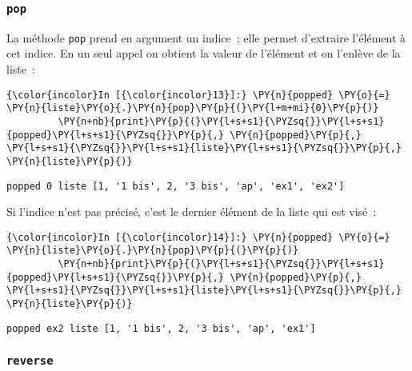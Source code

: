     \hypertarget{pop}{%
\subsubsection{\texorpdfstring{\texttt{pop}}{pop}}\label{pop}}

    La méthode \texttt{pop} prend en argument un indice~; elle permet
d'extraire l'élément à cet indice. En un seul appel on obtient la valeur
de l'élément et on l'enlève de la liste~:

    \begin{Verbatim}[commandchars=\\\{\},frame=single,framerule=0.3mm,rulecolor=\color{cellframecolor}]
{\color{incolor}In [{\color{incolor}13}]:} \PY{n}{popped} \PY{o}{=} \PY{n}{liste}\PY{o}{.}\PY{n}{pop}\PY{p}{(}\PY{l+m+mi}{0}\PY{p}{)}
         \PY{n+nb}{print}\PY{p}{(}\PY{l+s+s1}{\PYZsq{}}\PY{l+s+s1}{popped}\PY{l+s+s1}{\PYZsq{}}\PY{p}{,} \PY{n}{popped}\PY{p}{,} \PY{l+s+s1}{\PYZsq{}}\PY{l+s+s1}{liste}\PY{l+s+s1}{\PYZsq{}}\PY{p}{,} \PY{n}{liste}\PY{p}{)}
\end{Verbatim}


    \begin{Verbatim}[commandchars=\\\{\},frame=single,framerule=0.3mm,rulecolor=\color{cellframecolor}]
popped 0 liste [1, '1 bis', 2, '3 bis', 'ap', 'ex1', 'ex2']
\end{Verbatim}

    Si l'indice n'est pas précisé, c'est le dernier élément de la liste qui
est visé~:

    \begin{Verbatim}[commandchars=\\\{\},frame=single,framerule=0.3mm,rulecolor=\color{cellframecolor}]
{\color{incolor}In [{\color{incolor}14}]:} \PY{n}{popped} \PY{o}{=} \PY{n}{liste}\PY{o}{.}\PY{n}{pop}\PY{p}{(}\PY{p}{)}
         \PY{n+nb}{print}\PY{p}{(}\PY{l+s+s1}{\PYZsq{}}\PY{l+s+s1}{popped}\PY{l+s+s1}{\PYZsq{}}\PY{p}{,} \PY{n}{popped}\PY{p}{,} \PY{l+s+s1}{\PYZsq{}}\PY{l+s+s1}{liste}\PY{l+s+s1}{\PYZsq{}}\PY{p}{,} \PY{n}{liste}\PY{p}{)}
\end{Verbatim}


    \begin{Verbatim}[commandchars=\\\{\},frame=single,framerule=0.3mm,rulecolor=\color{cellframecolor}]
popped ex2 liste [1, '1 bis', 2, '3 bis', 'ap', 'ex1']
\end{Verbatim}

    \hypertarget{reverse}{%
\subsubsection{\texorpdfstring{\texttt{reverse}}{reverse}}\label{reverse}}

